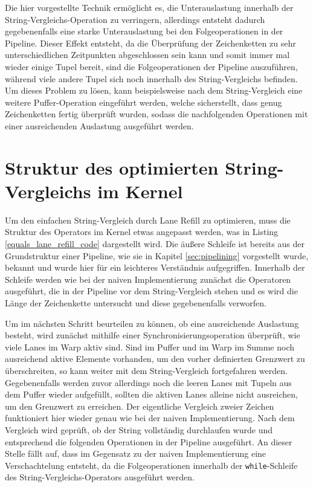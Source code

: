 Die hier vorgestellte Technik ermöglicht es, die Unterauslastung innerhalb der String-Vergleichs-Operation zu verringern, allerdings entsteht dadurch gegebenenfalls eine starke Unterauslastung bei den Folgeoperationen in der Pipeline.
Dieser Effekt entsteht, da die Überprüfung der Zeichenketten zu sehr unterschiedlichen Zeitpunkten abgeschlossen sein kann und somit immer mal wieder einige Tupel bereit, sind die Folgeoperationen der Pipeline auszuführen, während viele andere Tupel sich noch innerhalb des String-Vergleichs befinden.
Um dieses Problem zu lösen, kann beispielsweise nach dem String-Vergleich eine weitere Puffer-Operation eingeführt werden, welche sicherstellt, dass genug Zeichenketten fertig überprüft wurden, sodass die nachfolgenden Operationen mit einer ausreichenden Auslastung ausgeführt werden.

\section{Struktur des optimierten String-Vergleichs im Kernel}

Um den einfachen String-Vergleich durch Lane Refill zu optimieren, muss die Struktur des Operators im Kernel etwas angepasst werden, was in Listing \ref{equals_lane_refill_code} dargestellt wird.
Die äußere Schleife ist bereits aus der Grundstruktur einer Pipeline, wie sie in Kapitel \ref{sec:pipelining} vorgestellt wurde, bekannt und wurde hier für ein leichteres Verständnis aufgegriffen.
Innerhalb der Schleife werden wie bei der naiven Implementierung zunächst die Operatoren ausgeführt, die in der Pipeline vor dem String-Vergleich stehen und es wird die Länge der Zeichenkette untersucht und diese gegebenenfalls verworfen.

Um im nächsten Schritt beurteilen zu können, ob eine ausreichende Auslastung besteht, wird zunächst mithilfe einer Synchronisierungsoperation überprüft, wie viele Lanes im Warp aktiv sind.
Sind im Puffer und im Warp im Summe noch ausreichend aktive Elemente vorhanden, um den vorher definierten Grenzwert zu überschreiten, so kann weiter mit dem String-Vergleich fortgefahren werden.
Gegebenenfalls werden zuvor allerdings noch die leeren Lanes mit Tupeln aus dem Puffer wieder aufgefüllt, sollten die aktiven Lanes alleine nicht ausreichen, um den Grenzwert zu erreichen.
Der eigentliche Vergleich zweier Zeichen funktioniert hier wieder genau wie bei der naiven Implementierung.
Nach dem Vergleich wird geprüft, ob der String vollständig durchlaufen wurde und entsprechend die folgenden Operationen in der Pipeline ausgeführt.
An dieser Stelle fällt auf, dass im Gegensatz zu der naiven Implementierung eine Verschachtelung entsteht, da die Folgeoperationen innerhalb der \texttt{while}-Schleife des String-Vergleichs-Operators ausgeführt werden.

